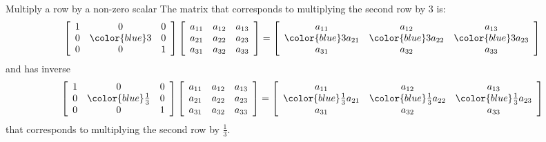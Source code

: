 \documentclass{beamer}
\begin{document}
\begin{frame}{Multiply a row by a non-zero scalar}
  The matrix that corresponds to multiplying the second row by $3$ is:\vfill
  \begin{equation*}
    \left[
      \begin{array}{ccc}
        1&0&0\\
        0&{\color{blue}3}&0\\
        0&0&1
      \end{array}
    \right]
    \left[
      \begin{array}{ccc}
        a_{11}&a_{12}&a_{13}\\
        a_{21}&a_{22}&a_{23}\\
        a_{31}&a_{32}&a_{33}
      \end{array}
    \right]=
    \left[
      \begin{array}{ccc}
        a_{11}&a_{12}&a_{13}\\
        {\color{blue}3}a_{21}&{\color{blue}3}a_{22}&{\color{blue}3}a_{23}\\
        a_{31}&a_{32}&a_{33}
      \end{array}
    \right]
  \end{equation*}\vfill
  and has inverse\vfill
   \begin{equation*}
    \left[
      \begin{array}{ccc}
        1&0&0\\
        0&{\color{blue}\frac{1}{3}}&0\\
        0&0&1
      \end{array}
    \right]
    \left[
      \begin{array}{ccc}
        a_{11}&a_{12}&a_{13}\\
        a_{21}&a_{22}&a_{23}\\
        a_{31}&a_{32}&a_{33}
      \end{array}
    \right]=
    \left[
      \begin{array}{ccc}
        a_{11}&a_{12}&a_{13}\\
        {\color{blue}\frac{1}{3}}a_{21}&{\color{blue}\frac{1}{3}}a_{22}&{\color{blue}\frac{1}{3}}a_{23}\\
        a_{31}&a_{32}&a_{33}
      \end{array}
    \right]
  \end{equation*}\vfill
  that corresponds to multiplying the second row by $\frac{1}{3}$.
\end{frame}
\end{document}
